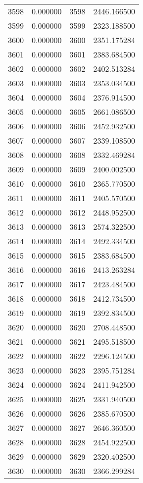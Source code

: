 \documentclass[12pt]{article}
\begin{document}
\begin{longtable}{@{}cccc@{}}
3598 & 0.000000 & 3598 & 2446.166500 \\
3599 & 0.000000 & 3599 & 2323.188500 \\
3600 & 0.000000 & 3600 & 2351.175284 \\
3601 & 0.000000 & 3601 & 2383.684500 \\
3602 & 0.000000 & 3602 & 2402.513284 \\
3603 & 0.000000 & 3603 & 2353.034500 \\
3604 & 0.000000 & 3604 & 2376.914500 \\
3605 & 0.000000 & 3605 & 2661.086500 \\
3606 & 0.000000 & 3606 & 2452.932500 \\
3607 & 0.000000 & 3607 & 2339.108500 \\
3608 & 0.000000 & 3608 & 2332.469284 \\
3609 & 0.000000 & 3609 & 2400.002500 \\
3610 & 0.000000 & 3610 & 2365.770500 \\
3611 & 0.000000 & 3611 & 2405.570500 \\
3612 & 0.000000 & 3612 & 2448.952500 \\
3613 & 0.000000 & 3613 & 2574.322500 \\
3614 & 0.000000 & 3614 & 2492.334500 \\
3615 & 0.000000 & 3615 & 2383.684500 \\
3616 & 0.000000 & 3616 & 2413.263284 \\
3617 & 0.000000 & 3617 & 2423.484500 \\
3618 & 0.000000 & 3618 & 2412.734500 \\
3619 & 0.000000 & 3619 & 2392.834500 \\
3620 & 0.000000 & 3620 & 2708.448500 \\
3621 & 0.000000 & 3621 & 2495.518500 \\
3622 & 0.000000 & 3622 & 2296.124500 \\
3623 & 0.000000 & 3623 & 2395.751284 \\
3624 & 0.000000 & 3624 & 2411.942500 \\
3625 & 0.000000 & 3625 & 2331.940500 \\
3626 & 0.000000 & 3626 & 2385.670500 \\
3627 & 0.000000 & 3627 & 2646.360500 \\
3628 & 0.000000 & 3628 & 2454.922500 \\
3629 & 0.000000 & 3629 & 2320.402500 \\
3630 & 0.000000 & 3630 & 2366.299284 \\

\end{longtable}
\end{document}
